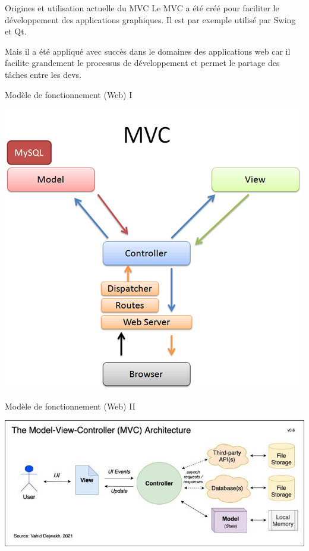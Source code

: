 \documentclass{beamer}
\begin{document}
\begin{frame}{Origines et utilisation actuelle du MVC}
  Le MVC a été créé pour faciliter le développement des applications graphiques. Il est par exemple utilisé par Swing et Qt.
  
  Mais il a été appliqué avec succès dans le domaines des applications web car il facilite grandement le processus de développement et permet le partage des tâches entre les devs.
\end{frame}

\begin{frame}{Modèle de fonctionnement (Web) I}
  \begin{center}
    \includegraphics[scale=0.3]{images/mvc-rails.converted.png}
  \end{center}
\end{frame}

\begin{frame}{Modèle de fonctionnement (Web) II}
  \begin{center}
    \includegraphics[scale=0.4]{images/mvc-architecture.jpg}
  \end{center}
\end{frame}
\end{document}
